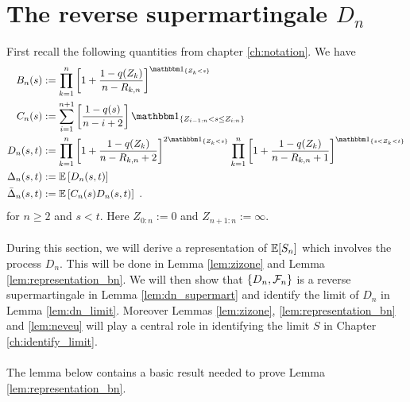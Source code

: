 \section{The reverse supermartingale $D_n$}\label{sec:supermart}
First recall the following quantities from chapter \ref{ch:notation}. We have
\begin{align*}
B_n(s) &:= \prod_{k=1}^{n}\left[1+\frac{1-q(Z_{k})}{n-R_{k,n}}\right]^{\I{Z_{k} < s}}\\
C_n(s) &:= \sum_{i=1}^{n+1}\left[\frac{1-q(s)}{n-i+2}\right]\I{Z_{i-1:n} < s \leq Z_{i:n}}\\
D_n(s,t) &:= \prod_{k=1}^{n} \left[1+\frac{1-q(Z_k)}{n-R_{k,n} +2}\right]^{2\I{Z_k<s}} \prod_{k=1}^{n}\left[1+\frac{1-q(Z_k)}{n-R_ {k,n}+1}\right]^{\I{s < Z_k < t}}\\
\Delta_n(s,t) &:= \E\left[D_n(s,t) \right]\\
\bar{\Delta}_n(s,t) &:= \E\left[C_n(s)D_n(s,t) \right]\mdot
\end{align*}
for $n\geq 2$ and $s < t$. Here $Z_{0:n} := 0$ and $Z_{n+1:n} := \infty$.\\
\\
During this section, we will derive a representation of $\mathbb{E}[S_n]$ which involves the process $D_n$. This will be done in Lemma \ref{lem:zizone} and Lemma \ref{lem:representation_bn}. We will then show that $\{D_n,\mathcal{F}_n\}$ is a reverse supermartingale in Lemma \ref{lem:dn_supermart} and identify the limit of $D_n$ in Lemma \ref{lem:dn_limit}. Moreover Lemmas \ref{lem:zizone}, \ref{lem:representation_bn} and \ref{lem:neveu} will play a central role in identifying the limit $S$ in Chapter \ref{ch:identify_limit}.\\
\\
The lemma below contains a basic result needed to prove Lemma \ref{lem:representation_bn}.
